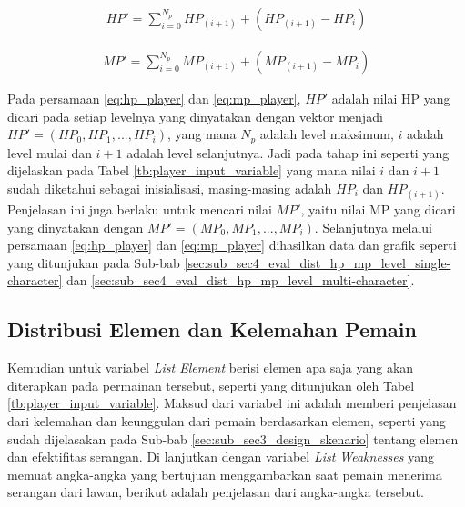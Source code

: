 \begin{equation}\label{eq:hp_player}
	\begin{split}
		HP' = \sum_{i = 0}^{N_{p}} HP_{(i + 1)} + \left(HP_{(i + 1)} - HP_{i} \right)
	\end{split}
\end{equation}

\begin{equation}\label{eq:mp_player}
	\begin{split}
		MP' = \sum_{i = 0}^{N_{p}} MP_{(i + 1)} + \left(MP_{(i + 1)} - MP_{i} \right)
	\end{split}
\end{equation}

Pada persamaan \ref{eq:hp_player} dan \ref{eq:mp_player}, $HP'$ adalah nilai HP yang dicari pada setiap levelnya yang dinyatakan dengan vektor menjadi $HP' = \left (HP_{0}, HP_{1}, ..., HP_{i} \right )$, yang mana $N_{p}$ adalah level maksimum, $i$ adalah level mulai dan $i + 1$ adalah level selanjutnya. Jadi pada tahap ini seperti yang dijelaskan pada Tabel \ref{tb:player_input_variable} yang mana nilai $i$ dan $i + 1$ sudah diketahui sebagai inisialisasi, masing-masing adalah $HP_{i}$ dan $HP_{(i + 1)}$. Penjelasan ini juga berlaku untuk mencari nilai $MP'$, yaitu nilai MP yang dicari yang dinyatakan dengan $MP' = \left (MP_{0}, MP_{1}, ..., MP_{i} \right )$. Selanjutnya melalui persamaan \ref{eq:hp_player} dan \ref{eq:mp_player} dihasilkan data dan grafik seperti yang ditunjukan pada Sub-bab \ref{sec:sub_sec4_eval_dist_hp_mp_level_single-character} dan \ref{sec:sub_sec4_eval_dist_hp_mp_level_multi-character}.
\vspace{1ex}

\subsection{Distribusi Elemen dan Kelemahan Pemain}
\label{sec:sub_sec3_list_element_player}
\vspace{1ex}

Kemudian untuk variabel \textit{List Element} berisi elemen apa saja yang akan diterapkan pada permainan tersebut, seperti yang ditunjukan oleh Tabel \ref{tb:player_input_variable}. Maksud dari variabel ini adalah memberi penjelasan dari kelemahan dan keunggulan dari pemain berdasarkan elemen, seperti yang sudah dijelasakan pada Sub-bab \ref{sec:sub_sec3_design_skenario} tentang elemen dan efektifitas serangan. Di lanjutkan dengan variabel \textit{List Weaknesses} yang memuat angka-angka yang bertujuan menggambarkan saat pemain menerima serangan dari lawan, berikut adalah penjelasan dari angka-angka tersebut.

